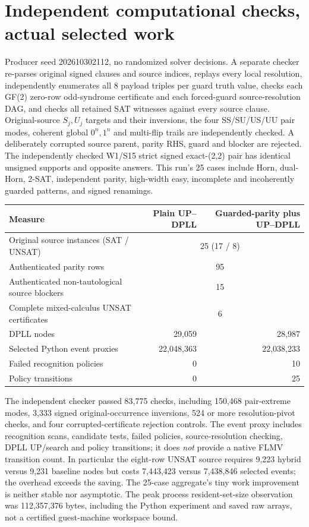 \documentclass[11pt]{article}
\begin{document}
\section{Independent computational checks, actual selected work}
Producer seed 202610302112, no randomized solver decisions. A separate checker re-parses original signed clauses and source indices, replays every local resolution, independently enumerates all 8 payload triples per guard truth value, checks each GF(2) zero-row odd-syndrome certificate and each forced-guard source-resolution DAG, and checks all retained SAT witnesses against every source clause. Original-source $S_j,U_j$ targets and their inversions, the four SS/SU/US/UU pair modes, coherent global $0^n,1^n$ and multi-flip trails are independently checked. A deliberately corrupted source parent, parity RHS, guard and blocker are rejected. The independently checked W1/S15 strict signed exact-(2,2) pair has identical unsigned supports and opposite answers. This run's 25 cases include Horn, dual-Horn, 2-SAT, independent parity, high-width easy, incomplete and incoherently guarded patterns, and signed renamings.
\begin{center}
\begin{tabular}{lrr}
\toprule
Measure&Plain UP--DPLL&Guarded-parity plus UP--DPLL\\\midrule
Original source instances (SAT / UNSAT)&\multicolumn{2}{c}{25 (17 / 8)}\\
Authenticated parity rows&\multicolumn{2}{c}{95}\\
Authenticated non-tautological source blockers&\multicolumn{2}{c}{15}\\
Complete mixed-calculus UNSAT certificates&\multicolumn{2}{c}{6}\\
DPLL nodes&29,059&28,987\\
Selected Python event proxies&22,048,363&22,038,233\\
Failed recognition policies&0&10\\
Policy transitions&0&25\\
\bottomrule
\end{tabular}
\end{center}
The independent checker passed 83,775 checks, including 150,468 pair-extreme modes, 3,333 signed original-occurrence inversions, 524 or more resolution-pivot checks, and four corrupted-certificate rejection controls. The event proxy includes recognition scans, candidate tests, failed policies, source-resolution checking, DPLL UP/search and policy transitions; it does \emph{not} provide a native FLMV transition count. In particular the eight-row UNSAT source requires 9,223 hybrid versus 9,231 baseline nodes but costs 7,443,423 versus 7,438,846 selected events; the overhead exceeds the saving. The 25-case aggregate's tiny work improvement is neither stable nor asymptotic. The peak process resident-set-size observation was 112,357,376 bytes, including the Python experiment and saved raw arrays, not a certified guest-machine workspace bound.
\end{document}
